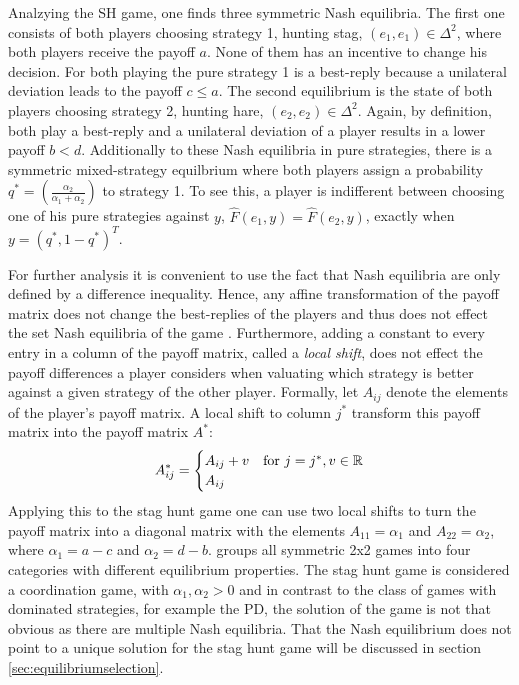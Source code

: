 Analzying the SH game, one finds three symmetric Nash equilibria.
The first one consists of both players choosing strategy 1, 
hunting stag, $(e_1,e_1) \in
\Delta^2$, where both players receive the payoff $a$. 
None of them has an incentive to change his decision. For both
playing the pure strategy 1 is a best-reply because a unilateral deviation 
leads to the payoff $c \leq a$.
The second equilibrium is the state of 
both players choosing strategy 2, hunting hare, $(e_2,e_2)
\in \Delta^2$. Again, by definition, both play a best-reply and a unilateral 
deviation of a player results in a lower payoff $b<d$.
Additionally to these Nash equilibria in pure strategies, there is a symmetric
mixed-strategy equilbrium where both players assign a probability 
$q^*=(\frac{\alpha_2}{\alpha_1 + \alpha_2})$ to strategy 1. 
To see this, a player is indifferent between choosing one of his pure
strategies against $y$, $\hat{F}(e_1,y) = \hat{F}(e_2,y)$, exactly
when $y=(q^*,1-q^*)^T$.

For further analysis it is convenient to use the fact that Nash equilibria 
are only defined by a difference inequality. 
Hence, any affine transformation of the payoff matrix does not change the 
best-replies of the players and thus does not effect the set Nash equilibria 
of the game \parencite[17-19]{weibull_evolutionary_1997}. 
Furthermore, adding a constant to every entry in a 
column of the payoff matrix, 
called a \textit{local shift}, does not effect the payoff differences
a player considers when valuating which strategy is better against a given
strategy of the other player.
Formally, let $A_{ij}$ denote the elements of the player's payoff matrix. 
A local shift to column $j^*$ transform this payoff matrix into the payoff 
matrix $A^*$:
\begin{align*}
        A^*_{ij} =
        \begin{cases}
                A_{ij} + v & \text{for}\ j=j^*, v \in \mathbb{R} \\
                A_{ij}
        \end{cases}
\end{align*}
Applying this to the stag hunt game one can use two local shifts to turn 
the payoff matrix into a diagonal matrix with the elements $A_{11}=\alpha_1$ 
and $A_{22}=\alpha_2$, where $\alpha_1=a-c$ and $\alpha_2=d-b$. 
\textcite[28]{weibull_evolutionary_1997} groups all symmetric 2x2 games into 
four categories with different equilibrium properties. 
The stag hunt game is considered a coordination 
game, with $\alpha_1, \alpha_2 > 0$ and in contrast to the class of games
with dominated strategies, for example the PD, the solution of the game
is not that obvious as there are multiple Nash equilibria.
That the Nash equilibrium does not point to a unique solution for the stag
hunt game will be discussed in section \ref{sec:equilibriumselection}.

